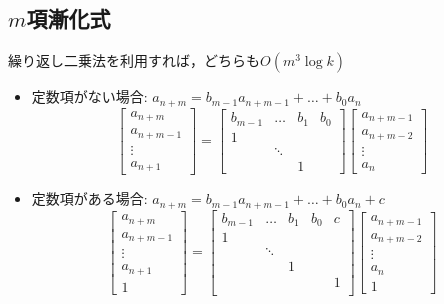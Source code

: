 \subsection{$m$項漸化式}
繰り返し二乗法を利用すれば，どちらも$O(m^3 \log k)$
\begin{itemize}
	\item 定数項がない場合: $a_{n+m} = b_{m-1}a_{n+m-1} + \dots + b_0a_n$
	\[
		\left[\begin{array}{c} a_{n+m} \\ a_{n+m-1} \\ \vdots \\ a_{n+1} \end{array} \right]
		= \left[\begin{array}{cccc}
			b_{m-1} & \dots & b_1 & b_0 \\
			1 &  &  &  \\
			& \ddots &  &  \\
			&  & 1 &
		\end{array} \right]
		\left[\begin{array}{c} a_{n+m-1} \\ a_{n+m-2} \\ \vdots \\ a_n \end{array} \right]
	\]
	\item 定数項がある場合: $a_{n+m} = b_{m-1}a_{n+m-1} + \dots + b_0a_n + c$
	\[
		\left[\begin{array}{c} a_{n+m} \\ a_{n+m-1} \\ \vdots \\ a_{n+1} \\ 1 \end{array} \right]
		= \left[\begin{array}{ccccc}
			b_{m-1} & \dots & b_1 & b_0 & c \\
			1 &  &  &  & \\
			& \ddots &  &  & \\
			&  & 1 &  & \\
			&  &  &  & 1 \\
		\end{array} \right]
		\left[\begin{array}{c} a_{n+m-1} \\ a_{n+m-2} \\ \vdots \\ a_n \\ 1 \end{array} \right]
	\]
\end{itemize}

